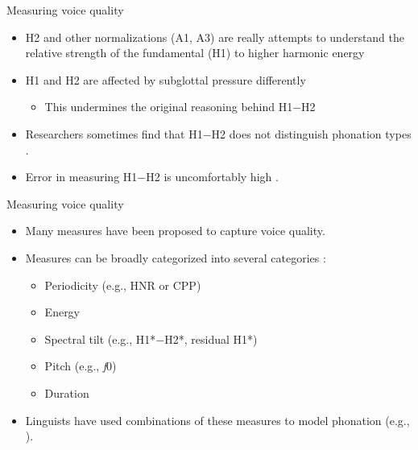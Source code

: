 \documentclass[professionalfont]{beamer}
\begin{document}
\begin{frame}{Measuring voice quality}
  \begin{itemize}
    \item H2 and other normalizations (A1, A3) are really attempts to understand the relative strength of the fundamental (H1) to higher harmonic energy
    \item H1 and H2 are affected by subglottal pressure differently \citep{sundbergObjectiveCharacterizationPhonation2022}
    \begin{itemize}
      \item This undermines the original reasoning behind H1$-$H2
    \end{itemize} 
    \item Researchers sometimes find that H1$-$H2 does not distinguish phonation types \citep[e.g.,][]{espositoVariationContrastivePhonation2010,espositoAcousticElectroglottographicStudy2012,garellekPhoneticsWhiteHmong2023}.
    \item Error in measuring H1$-$H2 is uncomfortably high \citep[e.g.,][]{chaiH1H2AcousticMeasure2022}.
  \end{itemize}
\end{frame}

\begin{frame}{Measuring voice quality}
  \begin{itemize}
    \item Many measures have been proposed to capture voice quality.
    \item Measures can be broadly categorized into several categories \citep{gordonPhonationTypesCrosslinguistic2001}:
    \begin{itemize}
      \item Periodicity (e.g., HNR or CPP)
      \item Energy 
      \item Spectral tilt (e.g., H1*$-$H2*, residual H1*)
      \item Pitch (e.g., \textit{f}0)
      \item Duration 
    \end{itemize}
  \item Linguists have used combinations of these measures to model phonation (e.g., \cite{blankenshipTimingNonmodalPhonation2002,brunelleTonePhonationSoutheast2016,espositoAcousticElectroglottographicStudy2012}).
  \end{itemize}
\end{frame}
\end{document}
